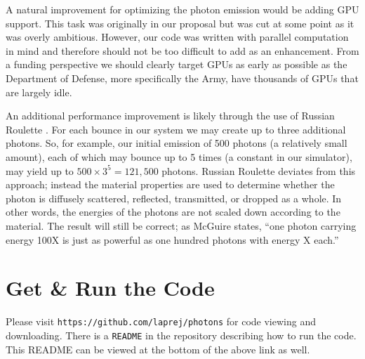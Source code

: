 \documentclass[%
        final,
        notitlepage,
        narroweqnarray,
        inline,
        twoside,
        ]{ieee}
\begin{document}
A natural improvement for optimizing the photon emission would be adding
GPU support.  This task was originally in our proposal but was cut at some
point as it was overly ambitious.  However, our code was written with
parallel computation in mind and therefore should not be too difficult to
add as an enhancement.  From a funding perspective we should clearly target
GPUs as early as possible as the Department of Defense, more specifically the
Army, have thousands of GPUs that are largely idle.

An additional performance improvement is likely through the use of
Russian Roulette \cite{Jensen96globalillumination}\cite{Russian}.  For each
bounce in our
system we may create up to three additional photons.  So, for example, our
initial emission of 500 photons (a relatively small amount), each of which may
bounce up to 5 times (a constant in our simulator), may yield up
to $500 \times 3^5 = 121,500$ photons.  Russian Roulette deviates from this
approach; instead the material properties are used to determine whether the
photon is diffusely scattered, reflected, transmitted, or dropped as a whole.
In other words, the energies of the photons are not scaled down according to
the material.  The result will still be correct; as McGuire states,
``one photon carrying energy 100X is just as powerful as one hundred photons
with energy X each.''\cite{Russian}

\section{Get \& Run the Code}
Please visit \texttt{https://github.com/laprej/photons} for code viewing
and downloading.  There is a \texttt{README} in the repository describing how
to run the code.  This README can be viewed at the bottom of the above link
as well.



\newpage
\end{document}
